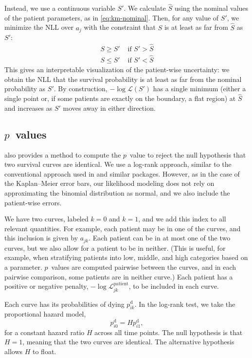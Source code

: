 \documentclass[article]{jss}
\newcommand{\KM}{Kaplan--Meier} %
\begin{document}
Instead, we use a continuous variable \(S'\). We calculate \(\hat{S}\) using the nominal values of the patient parameters, as in \cref{eq:km-nominal}. Then, for any value of \(S'\), we minimize the NLL over \(a_j\) with the constraint that \(S\) is at least as far from \(\hat{S}\) as \(S'\):
\begin{align}
S \ge S' & \text{ if } S' > \hat{S} \\
S \le S' & \text{ if } S' < \hat{S}
\end{align}
This gives an interpretable visualization of the patient-wise uncertainty: we obtain the NLL that the survival probability is at least as far from the nominal probability as \(S'\). By construction, \(-\log\mathcal{L}(S')\) has a single minimum (either a single point or, if some patients are exactly on the boundary, a flat region) at \(\hat{S}\) and increases as \(S'\) moves away in either direction.

\subsection[p~values]{\(p\)~values}

 also provides a method to compute the \(p\)~value to reject the null hypothesis that two survival curves are identical. We use a log-rank approach, similar to the conventional approach used in  and similar packages. However, as in the case of the \KM{} error bars, our likelihood modeling does not rely on approximating the binomial distribution as normal, and we also include the patient-wise errors.

We have two curves, labeled \(k=0\) and \(k=1\), and we add this index to all relevant quantities. For example, each patient may be in one of the curves, and this inclusion is given by \(a_{jk}\). Each patient can be in at most one of the two curves, but we also allow for a patient to be in neither. (This is useful, for example, when stratifying patients into low, middle, and high categories based on a parameter\@. \(p\)~values are computed pairwise between the curves, and in each pairwise comparison, some patients are in neither curve.)  Each patient has a positive or negative penalty, \(-\log\mathcal{L}_{jk}^\text{patient}\), to be included in each curve.

Each curve has its probabilities of dying \(p^\text{d}_{ik}\). In the log-rank test, we take the proportional hazard model,
\begin{equation}
p^\text{d}_{i0} = H p^\text{d}_{i1},
\label{eq:logrank-hazard}
\end{equation}
for a constant hazard ratio \(H\) across all time points. The null hypothesis is that \(H=1\), meaning that the two curves are identical. The alternative hypothesis allows \(H\) to float.
\end{document}

